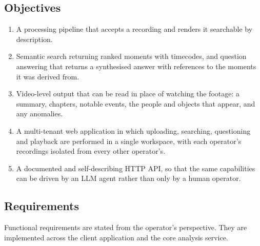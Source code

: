 \documentclass[11pt,a4paper]{article}
\begin{document}
\subsection{Objectives}

\begin{enumerate}[label=O-\arabic*.,leftmargin=3.0em]
  \item A processing pipeline that accepts a recording and renders it searchable
        by description.
  \item Semantic search returning ranked moments with timecodes, and question
        answering that returns a synthesised answer with references to the
        moments it was derived from.
  \item Video-level output that can be read in place of watching the footage: a
        summary, chapters, notable events, the people and objects that appear,
        and any anomalies.
  \item A multi-tenant web application in which uploading, searching,
        questioning and playback are performed in a single workspace, with each
        operator's recordings isolated from every other operator's.
  \item A documented and self-describing HTTP API, so that the same capabilities
        can be driven by an LLM agent rather than only by a human operator.
\end{enumerate}

\subsection{Requirements}

Functional requirements are stated from the operator's perspective. They are
implemented across the client application and the core analysis service.
\end{document}
